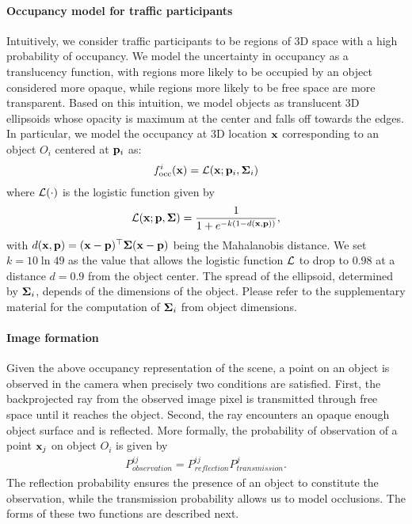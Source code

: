 \vspace{-0.3cm}
\paragraph{Occupancy model for traffic participants}
Intuitively, we consider traffic participants to be regions of 3D space with a high probability of occupancy. We model the uncertainty in occupancy as a translucency function, with regions more likely to be occupied by an object considered more opaque, while regions more likely to be free space are more transparent. Based on this intuition, we model objects as translucent 3D ellipsoids whose opacity is maximum at the center and falls off towards the edges. In particular, we model the occupancy at 3D location $\mathbf{x}$ corresponding to an object $O_i$ centered at $\mathbf{p}_i$ as:
\begin{align}
  f^i_{\text{occ}}(\mathbf{x}) = \mathcal{L}(\mathbf{x}; \mathbf{p}_i, \bm{\Sigma}_i)
\end{align}
where $\mathcal{L}(\cdot)$ is the logistic function given by
\begin{align}
  \mathcal{L}(\mathbf{x}; \mathbf{p}, \bm{\Sigma}) = \frac{1}{1 + e^{-k(1 - d(\mathbf{x},\mathbf{p}))}},
\end{align}
with $d(\mathbf{x}, \mathbf{p}) = (\mathbf{x}-\mathbf{p})^\top\bm{\Sigma}(\mathbf{x}-\mathbf{p})$ being the Mahalanobis distance. We set $k = 10\ln{49}$ as the value that allows the logistic function $\mathcal{L}$ to drop to $0.98$ at a distance $d = 0.9$ from the object center. The spread of the ellipsoid, determined by $\bm{\Sigma}_i$, depends of the dimensions of the object. Please refer to the supplementary material for the computation of $\bm{\Sigma}_i$ from object dimensions.


\vspace{-0.3cm}
\paragraph{Image formation}
Given the above occupancy representation of the scene, a point on an object is observed in the camera when precisely two conditions are satisfied. First, the backprojected ray from the observed image pixel is transmitted through free space until it reaches the object. Second, the ray encounters an opaque enough object surface and is reflected. More formally, the probability of observation of a point $\mathbf{x}_j$ on object $O_i$ is given by
\begin{align}
P^{ij}_{\textit{observation}} = P^{ij}_{\textit{reflection}}P^{j}_{\textit{transmission}}.
\label{eq:imgform}
\end{align}
The reflection probability ensures the presence of an object to constitute the observation, while the transmission probability allows us to model occlusions. The forms of these two functions are described next.


